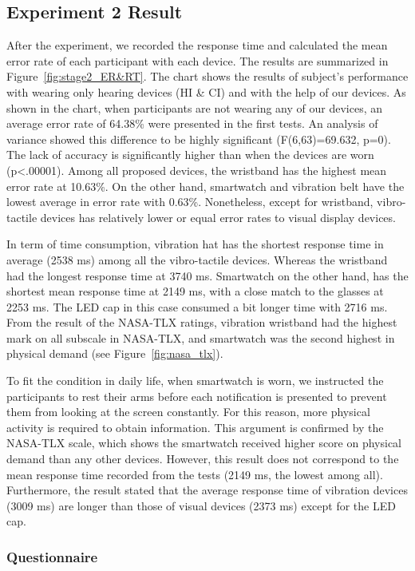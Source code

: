 \documentclass{sigchi}
\begin{document}
\subsection{Experiment 2 Result}
After the experiment, we recorded the response time and calculated the mean error rate of each participant with each device. The results are summarized in Figure~\ref{fig:stage2_ER&RT}. The chart shows the results of subject's performance with wearing only hearing devices (HI \& CI) and with the help of our devices. As shown in the chart, when participants are not wearing any of our devices, an average error rate of 64.38\% were presented in the first tests. An analysis of variance showed this difference to be highly significant (F(6,63)=69.632, p=0). The lack of accuracy is significantly higher than when the devices are worn (p\textless.00001). Among all proposed devices, the wristband has the highest mean error rate at 10.63\%. On the other hand, smartwatch and vibration belt have the lowest average in error rate with 0.63\%. Nonetheless, except for wristband, vibro-tactile devices has relatively lower or equal error rates to visual display devices.

In term of time consumption, vibration hat has the shortest response time in average (2538 ms) among all the vibro-tactile devices. Whereas the wristband had the longest response time at 3740 ms. Smartwatch on the other hand, has the shortest mean response time at 2149 ms, with a close match to the glasses at 2253 ms. The LED cap in this case consumed a bit longer time with 2716 ms. From the result of the NASA-TLX ratings, vibration wristband had the highest mark on all subscale in NASA-TLX, and smartwatch was the second highest in physical demand (see Figure~\ref{fig:nasa_tlx}). 

To fit the condition in daily life, when smartwatch is worn, we instructed the participants to rest their arms before each notification is presented to prevent them from looking at the screen constantly. For this reason, more physical activity is required to obtain information. This argument is confirmed by the NASA-TLX scale, which shows the smartwatch received higher score on physical demand than any other devices. However, this result does not correspond to the mean response time recorded from the tests (2149 ms, the lowest among all). Furthermore, the result stated that the average response time of vibration devices (3009 ms) are longer than those of visual devices (2373 ms) except for the LED cap.

\subsubsection{Questionnaire}
\end{document}
